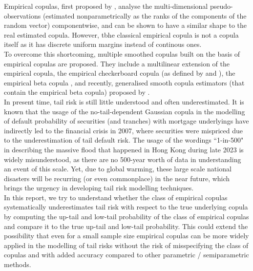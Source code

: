 \documentclass[12pt]{report}
\newcommand{\1}{\mathbf{1}}
\begin{document}
\begin{flushleft}
\vspace{0.5cm}
Empirical copulas, first proposed by \cite{DeheuvelsEC}, analyse the multi-dimensional pseudo-observations (estimated nonparametrically as the ranks of the components of the random vector) componentwise, and can be shown to have a similar shape to the real estimated copula. However, tbhe classical empirical copula is not a copula itself as it has discrete uniform margins instead of continous ones. \\
\vspace{0.5cm}
To overcome this shortcoming, multiple smoothed copulas built on the basis of empirical copulas are proposed. They include a multilinear extension of the empirical copula, the empirical checkerboard copula (as defined by \cite{CarleyTaylorECC} and \cite{HofertBook}), the empirical beta copula \parencite{SegersEBC}, and recently, generalised smooth copula estimators (that contain the empirical beta copula) proposed by \cite{KojadinovicYi2024Smooth}. \\
\vspace{0.5cm}
In present time, tail risk is still little understood and often underestimated. It is known that the usage of the no-tail-dependent Gaussian copula in the modelling of default probability of securities (and tranches) with mortgage underlyings have indirectly led to the financial crisis in 2007, where securities were mispriced due to the underestimation of tail default risk. The usage of the wordings ``1-in-500" in describing the massive flood that happened in Hong Kong during late 2023 is widely misunderstood, as there are no 500-year worth of data in understanding an event of this scale. Yet, due to global warming, these large scale national disasters will be recurring (or even commonplace) in the near future, which brings the urgency in developing tail risk modelling techniques. \\
\vspace{0.5cm}
In this report, we try to understand whether the class of empirical copulas systematically underestimates tail risk with respect to the true underlying copula by computing the up-tail and low-tail probability of the class of empirical copulas and compare it to the true up-tail and low-tail probability. This could extend the possibility that even for a small sample size empirical copulas can be more widely applied in the modelling of tail risks without the risk of misspecifying the class of copulas and with added accuracy compared to other parametric / semiparametric methods. \\
\vspace{0.5cm}


\end{flushleft}
\end{document}
